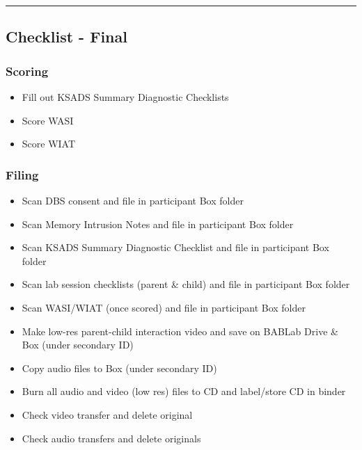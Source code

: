 \documentclass[]{book}
\providecommand{\tightlist}{%
  \setlength{\itemsep}{0pt}\setlength{\parskip}{0pt}}
\begin{document}
\begin{center}\rule{0.5\linewidth}{0.5pt}\end{center}

\hypertarget{checklist---final}{%
\subsection{Checklist - Final}\label{checklist---final}}

\hypertarget{scoring}{%
\subsubsection{Scoring}\label{scoring}}

\begin{itemize}
\tightlist
\item
  Fill out KSADS Summary Diagnostic Checklists
\item
  Score WASI
\item
  Score WIAT
\end{itemize}

\hypertarget{filing-1}{%
\subsubsection{Filing}\label{filing-1}}

\begin{itemize}
\tightlist
\item
  Scan DBS consent and file in participant Box folder
\item
  Scan Memory Intrusion Notes and file in participant Box folder
\item
  Scan KSADS Summary Diagnostic Checklist and file in participant Box folder
\item
  Scan lab session checklists (parent \& child) and file in participant Box folder
\item
  Scan WASI/WIAT (once scored) and file in participant Box folder
\item
  Make low-res parent-child interaction video and save on BABLab Drive \& Box (under secondary ID)
\item
  Copy audio files to Box (under secondary ID)
\item
  Burn all audio and video (low res) files to CD and label/store CD in binder
\item
  Check video transfer and delete original
\item
  Check audio transfers and delete originals
\end{itemize}
\end{document}
